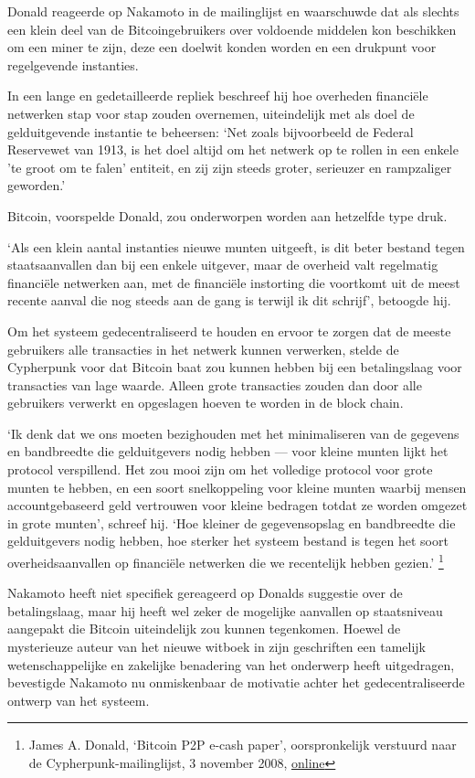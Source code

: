\documentclass[smalldemyvopaper,11pt,twoside,onecolumn,openright,extrafontsizes,hidelinks]{memoir}
\begin{document}
Donald reageerde op Nakamoto in de mailinglijst en waarschuwde dat als
slechts een klein deel van de Bitcoingebruikers over voldoende middelen
kon beschikken om een miner te zijn, deze een doelwit konden worden en
een drukpunt voor regelgevende instanties.

In een lange en gedetailleerde repliek beschreef hij hoe overheden
financiële netwerken stap voor stap zouden overnemen, uiteindelijk met
als doel de gelduitgevende instantie te beheersen: `Net zoals
bijvoorbeeld de Federal Reservewet van 1913, is het doel altijd om het
netwerk op te rollen in een enkele 'te groot om te falen' entiteit, en
zij zijn steeds groter, serieuzer en rampzaliger geworden.'

Bitcoin, voorspelde Donald, zou onderworpen worden aan hetzelfde type
druk.

`Als een klein aantal instanties nieuwe munten uitgeeft, is dit beter
bestand tegen staatsaanvallen dan bij een enkele uitgever, maar de
overheid valt regelmatig financiële netwerken aan, met de financiële
instorting die voortkomt uit de meest recente aanval die nog steeds aan
de gang is terwijl ik dit schrijf', betoogde hij.

Om het systeem gedecentraliseerd te houden en ervoor te zorgen dat de
meeste gebruikers alle transacties in het netwerk kunnen verwerken,
stelde de Cypherpunk voor dat Bitcoin baat zou kunnen hebben bij een
betalingslaag voor transacties van lage waarde. Alleen grote transacties
zouden dan door alle gebruikers verwerkt en opgeslagen hoeven te worden
in de block chain.

`Ik denk dat we ons moeten bezighouden met het minimaliseren van de
gegevens en bandbreedte die gelduitgevers nodig hebben --- voor kleine
munten lijkt het protocol verspillend. Het zou mooi zijn om het
volledige protocol voor grote munten te hebben, en een soort
snelkoppeling voor kleine munten waarbij mensen accountgebaseerd geld
vertrouwen voor kleine bedragen totdat ze worden omgezet in grote
munten', schreef hij. `Hoe kleiner de gegevensopslag en bandbreedte die
gelduitgevers nodig hebben, hoe sterker het systeem bestand is tegen het
soort overheidsaanvallen op financiële netwerken die we recentelijk
hebben gezien.' \footnote{James A. Donald, `Bitcoin P2P e-cash paper',
  oorspronkelijk verstuurd naar de Cypherpunk-mailinglijst, 3 november
  2008,
  \href{https://www.metzdowd.com/pipermail/cryptography/2008-November/014819.html}{online}}

Nakamoto heeft niet specifiek gereageerd op Donalds suggestie over de
betalingslaag, maar hij heeft wel zeker de mogelijke aanvallen op
staatsniveau aangepakt die Bitcoin uiteindelijk zou kunnen tegenkomen.
Hoewel de mysterieuze auteur van het nieuwe witboek in zijn geschriften
een tamelijk wetenschappelijke en zakelijke benadering van het onderwerp
heeft uitgedragen, bevestigde Nakamoto nu onmiskenbaar de motivatie
achter het gedecentraliseerde ontwerp van het systeem.
\end{document}
